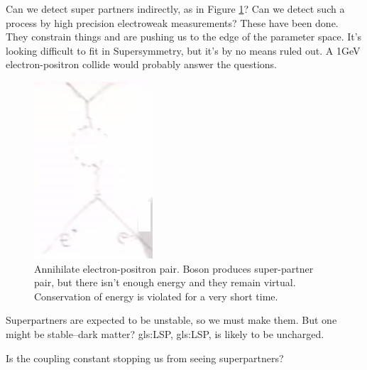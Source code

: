 \documentclass[]{article}
\begin{document}
Can we detect super partners indirectly, as in Figure \ref{fig:particles3-2-superpartners}? Can we detect such a process by high precision electroweak measurements? These have been done. They constrain things and are pushing us to the edge of the parameter space. It's looking difficult to fit in Supersymmetry, but it's by no means ruled out. A 1GeV electron-positron collide would probably answer the questions. 

\begin{figure}[H]
	\caption{Annihilate electron-positron pair. Boson produces super-partner pair, but there isn't enough energy and they remain virtual. Conservation of energy is violated for a very short time.}\label{fig:particles3-2-superpartners}
	\includegraphics{particles3-2-superpartners}
\end{figure}

Superpartners are expected to be unstable, so we must make them. But one might be stable--dark matter? \glsdesc{gls:LSP}, \gls{gls:LSP}, is likely to be uncharged.

Is the coupling constant stopping us from seeing superpartners?
\end{document}
